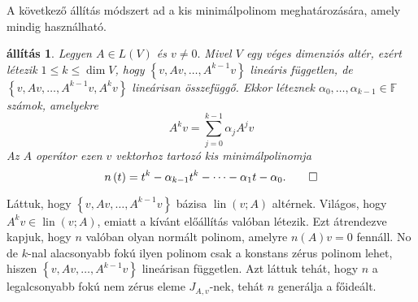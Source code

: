 \documentclass[9pt, a4paper, showtrims]{memoir}
\makeatletter
\renewenvironment{proof}[1][\proofname]
    {\par\pushQED{\qed}%
    \normalfont \topsep6\p@\@plus6\p@\relax
    \trivlist
    \item[\hskip\labelsep
        \itshape
    #1\@addpunct{:}]\ignorespaces}
    {\popQED\endtrivlist\@endpefalse}
\theoremstyle{plain}
\newtheorem{proposition}{állítás}[chapter]
\theoremstyle{remark}
\theoremstyle{definition}
\DeclareMathOperator{\lin}{lin}
\makeatother
\begin{document}
    A következő állítás módszert ad a kis minimálpolinom meghatározására,
    amely mindig használható.
    \begin{proposition}
        Legyen $A\in L\left( V \right)$ és $v\neq 0.$
        Mivel $V$ egy véges dimenziós altér,
        ezért létezik $1\leq k \leq \dim V$,
        hogy 
        $\left\{ v,Av,\dots,A^{k-1}v \right\}$ lineáris független,
        de $\left\{ v,Av,\dots,A^{k-1}v,A^{k}v \right\}$ lineárisan összefüggő.
        Ekkor léteznek $\alpha_0,\dots,\alpha_{k-1}\in\mathbb{F}$
        számok, amelyekre
        \[
            A^{k}v=\sum_{j=0}^{k-1}\alpha_jA^{j}v
        \]
        Az $A$ operátor ezen $v$ vektorhoz tartozó kis minimálpolinomja
        \[
            n\left( t \right)=
            t^k-\alpha_{k-1}t^k-\dots-\alpha_1t-\alpha_0.\qedhere
        \]
    \end{proposition} 
    \begin{proof}
        Láttuk, hogy $\left\{ v,Av,\dots,A^{k-1}v \right\}$ bázisa $\lin\left( v;A \right)$ altérnek.
        Világos, hogy $A^kv\in\lin\left( v;A \right)$, emiatt a kívánt előállítás valóban létezik.
        Ezt átrendezve kapjuk, hogy $n$ valóban olyan normált polinom, amelyre $n\left( A \right)v=0$ fennáll.
        No de $k$-nal alacsonyabb fokú ilyen polinom csak a konstans zérus polinom lehet,
        hiszen $\left\{ v,Av,\dots,A^{k-1}v \right\}$ lineárisan független.
        Azt láttuk tehát, hogy $n$ a legalcsonyabb fokú nem zérus eleme $J_{A,v}$-nek,
        tehát $n$ generálja a főideált.
    \end{proof}
\end{document}
